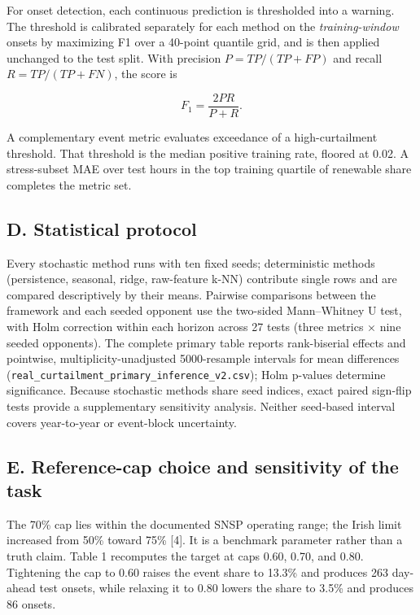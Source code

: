 \documentclass[
  10pt,
  a4paper,
]{article}
\begin{document}
For onset detection, each continuous prediction is thresholded into a
warning. The threshold is calibrated separately for each method on the
\emph{training-window} onsets by maximizing F1 over a 40-point quantile
grid, and is then applied unchanged to the test split. With precision
\(P=TP/(TP+FP)\) and recall \(R=TP/(TP+FN)\), the score is

\[
F_1=\frac{2PR}{P+R}.
\]

A complementary event metric evaluates exceedance of a high-curtailment
threshold. That threshold is the median positive training rate, floored
at 0.02. A stress-subset MAE over test hours in the top training
quartile of renewable share completes the metric set.

\subsection{D. Statistical protocol}\label{d.-statistical-protocol}

Every stochastic method runs with ten fixed seeds; deterministic methods
(persistence, seasonal, ridge, raw-feature k-NN) contribute single rows
and are compared descriptively by their means. Pairwise comparisons
between the framework and each seeded opponent use the two-sided
Mann--Whitney U test, with Holm correction within each horizon across 27
tests (three metrics × nine seeded opponents). The complete primary
table reports rank-biserial effects and pointwise,
multiplicity-unadjusted 5000-resample intervals for mean differences
(\texttt{real\_curtailment\_primary\_inference\_v2.csv}); Holm p-values
determine significance. Because stochastic methods share seed indices,
exact paired sign-flip tests provide a supplementary sensitivity
analysis. Neither seed-based interval covers year-to-year or event-block
uncertainty.

\subsection{E. Reference-cap choice and sensitivity of the
task}\label{e.-reference-cap-choice-and-sensitivity-of-the-task}

The 70\% cap lies within the documented SNSP operating range; the Irish
limit increased from 50\% toward 75\% {[}4{]}. It is a benchmark
parameter rather than a truth claim. Table 1 recomputes the target at
caps 0.60, 0.70, and 0.80. Tightening the cap to 0.60 raises the event
share to 13.3\% and produces 263 day-ahead test onsets, while relaxing
it to 0.80 lowers the share to 3.5\% and produces 86 onsets.
\end{document}
